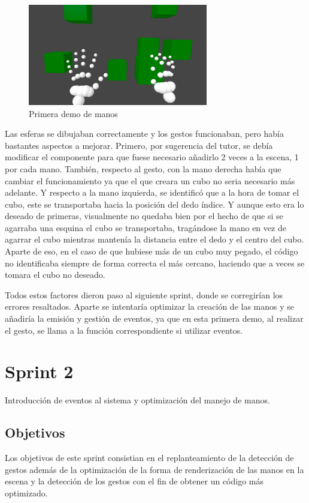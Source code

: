 \documentclass[a4paper, 12pt]{book}
\begin{document}
\begin{figure}[H] 
  \centering
  \includegraphics[width=0.7\textwidth]{img/primeras_manos.jpg} 
  \caption{Primera demo de manos}
  \label{fig:sprint1}
\end{figure}

Las esferas se dibujaban correctamente y los gestos funcionaban, pero había bastantes aspectos a mejorar. Primero, por sugerencia del tutor,
se debía modificar el componente para que fuese necesario añadirlo 2 veces a la escena, 1 por cada mano. También, respecto al gesto, con la mano derecha había que cambiar el funcionamiento
ya que el que creara un cubo no seria necesario más adelante. Y respecto a la mano izquierda, se identificó que a la hora de tomar el cubo, este se transportaba hacia la posición del dedo índice. 
Y aunque esto era lo deseado de primeras, visualmente no quedaba bien por el hecho de que si se agarraba una esquina el cubo se transportaba, tragándose la mano en vez de agarrar el cubo mientras mantenía la distancia entre el dedo y el centro del cubo. 
Aparte de eso, en el caso de que hubiese más de un cubo muy pegado, el código no identificaba siempre de forma correcta el más cercano, haciendo que a veces se tomara el cubo no deseado.

Todos estos factores dieron paso al siguiente sprint, donde se corregirían los errores resaltados. Aparte se intentaría optimizar la creación de las manos y se añadiría la emisión y gestión de eventos, ya que en esta primera demo, al realizar el gesto, se llama a la función correspondiente si utilizar eventos. 

\section{Sprint 2}
\label{sec:sprint2}
Introducción de eventos al sistema y optimización del manejo de manos. 

\subsection{Objetivos}
\label{subsec:objetivo-principal2}
Los objetivos de este sprint consistian en el replanteamiento de la detección de gestos además de la optimización de la forma de renderización de las manos en la escena y la detección de los gestos con el fin de obtener un código más optimizado. 
\end{document}
